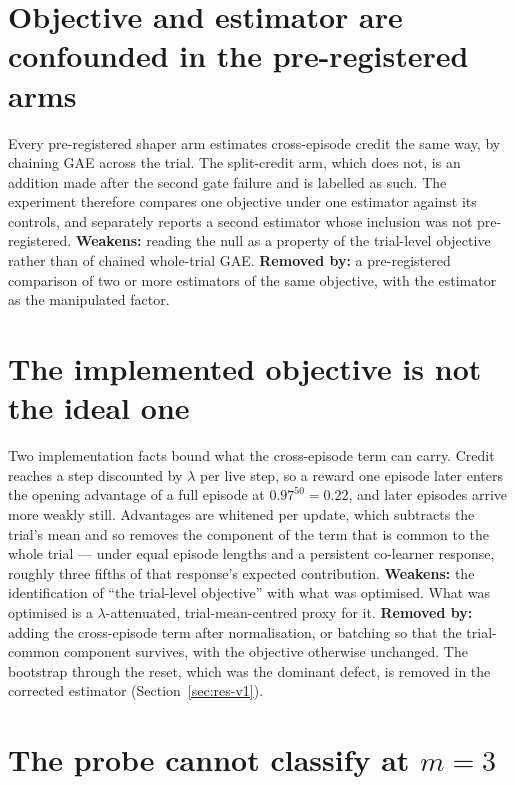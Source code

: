 \section{Objective and estimator are confounded in the pre-registered arms}
\label{sec:lim-estimator}

Every pre-registered shaper arm estimates cross-episode credit the same
way, by chaining GAE across the trial.
The split-credit arm, which does not, is an addition made after the second
gate failure and is labelled as such.
The experiment therefore compares one objective under one estimator against
its controls, and separately reports a second estimator whose inclusion was
not pre-registered.
\textbf{Weakens:} reading the null as a property of the trial-level
objective rather than of chained whole-trial GAE.
\textbf{Removed by:} a pre-registered comparison of two or more estimators
of the same objective, with the estimator as the manipulated factor.

\section{The implemented objective is not the ideal one}
\label{sec:lim-attenuation}

Two implementation facts bound what the cross-episode term can carry.
Credit reaches a step discounted by \(\lambda\) per live step, so a reward
one episode later enters the opening advantage of a full episode at
\(0.97^{50}=0.22\), and later episodes arrive more weakly still.
Advantages are whitened per update, which subtracts the trial's mean and so
removes the component of the term that is common to the whole trial ---
under equal episode lengths and a persistent co-learner response, roughly
three fifths of that response's expected contribution.
\textbf{Weakens:} the identification of ``the trial-level objective'' with
what was optimised.
What was optimised is a \(\lambda\)-attenuated, trial-mean-centred proxy for
it.
\textbf{Removed by:} adding the cross-episode term after normalisation, or
batching so that the trial-common component survives, with the objective
otherwise unchanged.
The bootstrap through the reset, which was the dominant defect, is removed
in the corrected estimator (Section~\ref{sec:res-v1}).

\section{The probe cannot classify at \texorpdfstring{\(m=3\)}{m = 3}}
\label{sec:lim-m3-probe}

